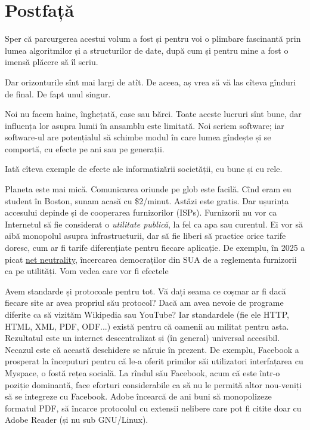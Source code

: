 \chapter*{Postfață}

Sper că parcurgerea acestui volum a fost și pentru voi o plimbare fascinantă prin lumea algoritmilor și a structurilor de date, după cum și pentru mine a fost o imensă plăcere să îl scriu.

Dar orizonturile sînt mai largi de atît. De aceea, aș vrea să vă las cîteva gînduri de final. De fapt unul singur.

Noi nu facem haine, înghețată, case sau bărci. Toate aceste lucruri sînt bune, dar influența lor asupra lumii în ansamblu este limitată. Noi scriem software; iar software-ul are potențialul să schimbe modul în care lumea gîndește și se comportă, cu efecte pe ani sau pe generații.

Iată cîteva exemple de efecte ale informatizării societății, cu bune și cu rele.

Planeta este mai mică. Comunicarea oriunde pe glob este facilă. Cînd eram eu student în Boston, sunam acasă cu \$2/minut. Astăzi este gratis. Dar ușurința accesului depinde și de cooperarea furnizorilor (ISPs). Furnizorii nu vor ca Internetul să fie considerat o \textit{utilitate publică}, la fel ca apa sau curentul. Ei vor să aibă monopolul asupra infrastructurii, dar să fie liberi să practice orice tarife doresc, cum ar fi tarife diferențiate pentru fiecare aplicație. De exemplu, în 2025 a picat \href{https://en.wikipedia.org/wiki/Net_neutrality}{net neutrality}, încercarea democraților din SUA de a reglementa furnizorii ca pe utilități. Vom vedea care vor fi efectele

Avem standarde și protocoale pentru tot. Vă dați seama ce coșmar ar fi dacă fiecare site ar avea propriul său protocol? Dacă am avea nevoie de programe diferite ca să vizităm Wikipedia sau YouTube? Iar standardele (fie ele HTTP, HTML, XML, PDF, ODF...) există pentru că oamenii au militat pentru asta. Rezultatul este un internet descentralizat și (în general) universal accesibil. Necazul este că această deschidere se năruie în prezent. De exemplu, Facebook a prosperat la începuturi pentru că le-a oferit primilor săi utilizatori interfațarea cu Myspace, o fostă rețea socială. La rîndul său Facebook, acum că este într-o poziție dominantă, face eforturi considerabile ca să nu le permită altor nou-veniți să se integreze cu Facebook. Adobe încearcă de ani buni să monopolizeze formatul PDF, să încarce protocolul cu extensii nelibere care pot fi citite doar cu Adobe Reader (și nu sub GNU/Linux).

